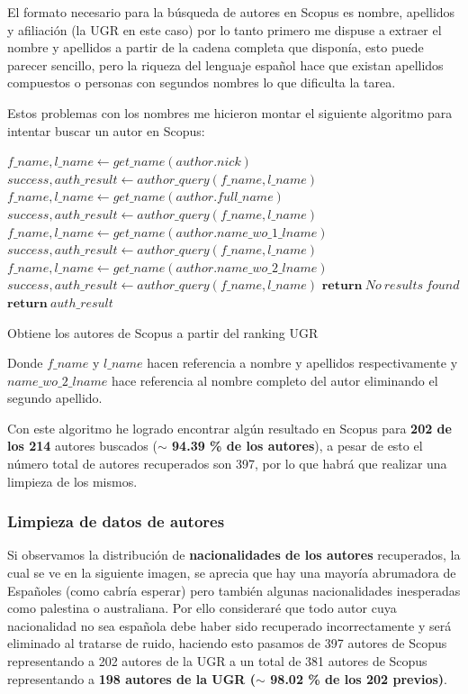 El formato necesario para la búsqueda de autores en Scopus es nombre, apellidos y afiliación (la \acrshort{UGR} en este caso) por lo tanto primero me dispuse a extraer el nombre y apellidos a partir de la cadena completa que disponía, esto puede parecer sencillo, pero la riqueza del lenguaje español hace que existan apellidos compuestos o personas con segundos nombres lo que dificulta la tarea.

Estos problemas con los nombres me hicieron montar el siguiente algoritmo para intentar buscar un autor en Scopus:


\begin{algorithm}[h]
	\begin{algorithmic} 
		\State $f\_name, l\_name \gets get\_name(author.nick)$
		\State $success, auth\_result  \gets author\_query(f\_name, l\_name)$
		\State $f\_name, l\_name \gets get\_name(author.full\_name)$
		\State $success, auth\_result  \gets author\_query(f\_name, l\_name)$
		\State $f\_name, l\_name \gets get\_name(author.name\_wo\_1\_lname)$
		\State $success, auth\_result  \gets author\_query(f\_name, l\_name)$
		\State $f\_name, l\_name \gets get\_name(author.name\_wo\_2\_lname)$
		\State $success, auth\_result  \gets author\_query(f\_name, l\_name)$
		\State $\textbf{return}\ No\ results\ found$
		\EndIf
		\EndIf
		\EndIf
		\EndIf
		\State $\textbf{return}\ auth\_result$
	
		\EndFor
	\end{algorithmic}  
	\caption{Obtiene los autores de Scopus a partir del ranking UGR}	
\end{algorithm}


Donde $f\_name$ y $l\_name$ hacen referencia a nombre y apellidos respectivamente y $name\_wo\_2\_lname$ hace referencia al nombre completo del autor eliminando el segundo apellido.

Con este algoritmo he logrado encontrar algún resultado en Scopus para \textbf{202 de los 214} autores buscados (\textbf{$\sim$ 94.39 \% de los autores}), a pesar de esto el número total de autores recuperados son 397, por lo que habrá que realizar una limpieza de los mismos.

\subsubsection{Limpieza de datos de autores}
Si observamos la distribución de \textbf{nacionalidades de los autores} recuperados, la cual se ve en la siguiente imagen, se aprecia que hay una mayoría abrumadora de Españoles (como cabría esperar) pero también algunas nacionalidades inesperadas como palestina o australiana. Por ello consideraré que todo autor cuya nacionalidad no sea española debe haber sido recuperado incorrectamente y será eliminado al tratarse de ruido, haciendo esto pasamos de 397 autores de Scopus representando a 202 autores de la \acrshort{UGR} a un total de 381 autores de Scopus representando a \textbf{198 autores de la \acrshort{UGR} ($\sim$ 98.02 \% de los 202 previos)}.

